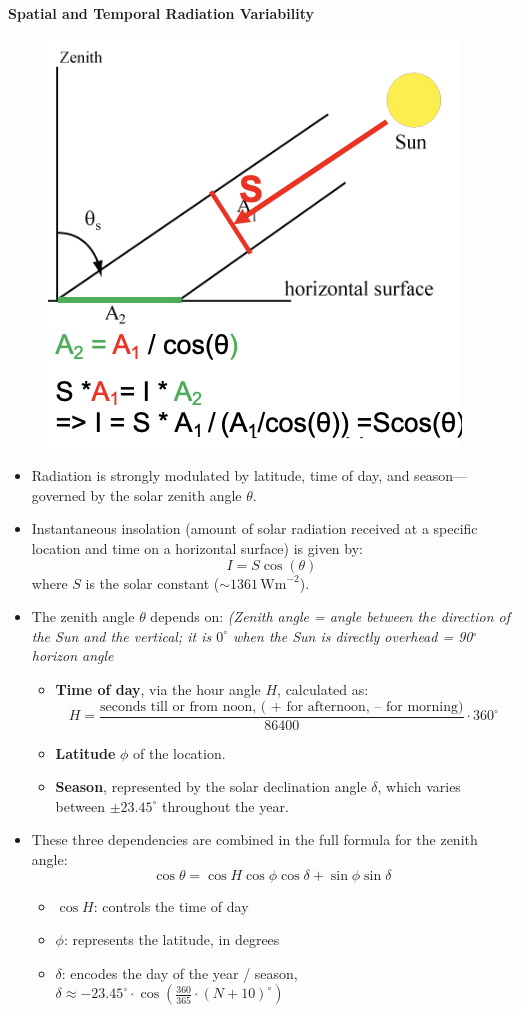 \documentclass[fontsize=8pt, a4paper, landscape, fleqn]{scrartcl}
\renewcommand{\subsection}[1]{%
    \noindent\colorbox{subsectioncolor}{%
        \parbox{\dimexpr\columnwidth-2\fboxsep}{\color{white}\textbf{#1}}}%
    \vspace{0.5mm}%
}
\begin{document}
\begin{multicols*}{3}[\raggedcolumns]
\subsection{Spatial and Temporal Radiation Variability}

\begin{figure}[H]
    \centering
    \includegraphics[width=0.2\linewidth]{CS//img/Isolation_at_specific_location.png}
\end{figure}
\begin{itemize}
    \item Radiation is strongly modulated by latitude, time of day, and season—governed by the solar zenith angle $\theta$.
    \item Instantaneous insolation (amount of solar radiation received at a specific location and time on a horizontal surface) is given by:
    \[
    I = S \cos(\theta)
    \]
    where $S$ is the solar constant ($\sim 1361\,\text{Wm}^{-2}$).
    \item The zenith angle $\theta$ depends on: \textit{(Zenith angle = angle between the direction of the Sun and the vertical; it is $0^\circ$ when the Sun is directly overhead = 90$^\circ$ horizon angle}
    \begin{itemize}
        \item \textbf{Time of day}, via the hour angle $H$, calculated as:
        \[
        H = \frac{\text{seconds till or from noon, 	( + for afternoon, – for morning)}}{86400} \cdot 360^\circ
        \]
        \item \textbf{Latitude} $\phi$ of the location.
        \item \textbf{Season}, represented by the solar declination angle $\delta$, which varies between $\pm 23.45^\circ$ throughout the year.
    \end{itemize}
    \item These three dependencies are combined in the full formula for the zenith angle:
    \[
    \cos \theta = \cos H \cos \phi \cos \delta + \sin \phi \sin \delta
    \]
    \begin{itemize}
        \item $\cos H$: controls the time of day
        \item $\phi$: represents the latitude, in degrees
        \item $\delta$: encodes the day of the year / season, $\delta \approx -23.45^\circ \cdot \cos\left( \frac{360}{365} \cdot (N + 10)^\circ \right)$
    \end{itemize}
\end{itemize}


\end{multicols*}
\end{document}
